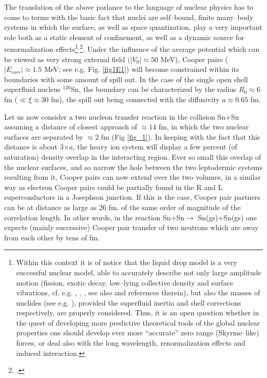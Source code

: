 The translation of the above parlance to the language of nuclear physics has to come to terms with the basic fact that nuclei are self--bound, finite many--body systems in which the surface, as well as space quantization, play a very important role both as a static element of confinement, as well as a dynamic source for renormalization effects\footnote{Within this context it is of notice that the liquid drop model is a very successful nuclear model, able to accurately describe not only large amplitude motion (fission, exotic decay, low--lying collective density and surface vibrations, cf. e.g. \cite{Bohr:39}, \cite{Barranco:90}, \cite{Bertsch:88b}, see also \cite{Brink:05} and references therein), but also the masses of nuclides (see e.g. \cite{Moller:95}), provided the superfluid inertia and shell corrections respectively, are properly considered. Thus, it is an open question whether in the quest of developing more predictive theoretical tools of the global nuclear properties one should develop ever more ``accurate'' zero range (Skyrme--like) forces, or deal also with the long wavelength, renormalization effects and induced interaction.}$^,$\footnote{\cite{Broglia:02d}.}.
Under the influence of the average potential which can be viewed as very strong external field $(|V_0|\approx 50$ MeV), Cooper pairs ($|E_{corr}|\approx 1.5$ MeV; see e.g. Fig. \ref{fig1E1}) will become constrained within its boundaries with some amount of spill out. In the case of the single open shell superfluid nucleus $^{120}$Sn, the boundary can be characterized by the radius $R_0\approx 6$ fm ($\ll \xi\approx 30$ fm), the spill out being connected with the diffusivity $a\approx 0.65$ fm. 


Let us now consider a two nucleon transfer reaction in the collision Sn+Sn assuming a distance of closest approach of $\approx 14$ fm, in which the two nuclear surfaces are separated by $\approx 2$ fm (Fig \ref{fig_1}). In keeping with the fact that this distance is about 3$\times a$, the heavy ion system will display a few percent (of saturation) density overlap in the interacting region. Ever so small this overlap of the nuclear surfaces, and so narrow the hole between the two leptodermic systems resulting from  it,  Cooper pairs can now extend over the two volumes, in a similar way as electron Cooper pairs could be partially found in the R and L superconductors in a Josephson junction. If this is the case, Cooper pair partners can be at distance as large as 26 fm, of the same order of magnitude of the correlation length. In other words, in the reaction Sn+Sn$\rightarrow$ Sn(gs)+Sn(gs) one expects (mainly successive) Cooper pair transfer of two neutrons which are away from each other by tens of fm.


